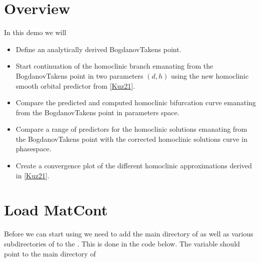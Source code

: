 \documentclass[letterpaper,10pt,english]{jupyterBook}
\begin{document}
\section{Overview}
\label{\detokenize{PredatorPrey:overview}}
\sphinxAtStartPar
In this demo we will
\begin{itemize}
\item {} 
\sphinxAtStartPar
Define an analytically derived Bogdanov\sphinxhyphen{}Takens point.

\item {} 
\sphinxAtStartPar
Start continuation of the homoclinic branch emanating from the
Bogdanov\sphinxhyphen{}Takens point in two parameters \((d,h)\) using the new homoclinic
smooth orbital predictor from {[}\hyperlink{cite.references:id3}{Kuz21}{]}.

\item {} 
\sphinxAtStartPar
Compare the predicted and computed homoclinic bifurcation curve emanating
from the Bogdanov\sphinxhyphen{}Takens point in parameters space.

\item {} 
\sphinxAtStartPar
Compare a range of predictors for the homoclinic solutions emanating from the
Bogdanov\sphinxhyphen{}Takens point with the corrected homoclinic solutions curve in
phase\sphinxhyphen{}space.

\item {} 
\sphinxAtStartPar
Create a convergence plot of the different homoclinic approximations
derived in {[}\hyperlink{cite.references:id3}{Kuz21}{]}.

\end{itemize}


\section{Load MatCont}
\label{\detokenize{PredatorPrey:load-matcont}}
\sphinxAtStartPar
Before we can start using  we need to add the main directory of
 as well as various subdirectories of  to the . This is done in the code below. The variable 
should point to the main directory of 
\end{document}
